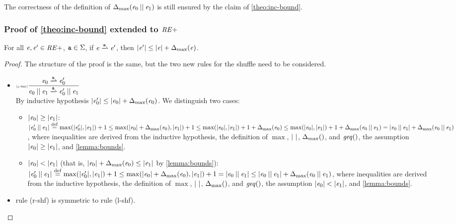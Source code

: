 The correctness of the definition of ${\Delta_{\max}}({\mathit {e}_0\mathbin{||}\mathit {e}_1})$ is still ensured by the claim of \cref{theo:inc-bound}.

\subsubsection*{Proof of \cref{theo:inc-bound} extended to $\mathit {RE+}$
}
For all $\mathit {e},\mathit {e}'\in\mathit {RE+}$, $\mathtt {a}\in\Sigma$, if $\re\parDer{\sym}\re'$, then ${\mid}{\mathit {e}'}{\mid}\leq {\mid}{\ensuremath{\mathit {e}}}{\mid}+{\Delta_{\max}}({\mathit {e}})$.

\begin{proof}
 The structure of the proof is the same, but the two new rules for the shuffle need to be considered.
 \begin{itemize}
  \item $\Rule{l-shf}{\re_0\parDer{\sym}\re'_0}{\re_0\shuffleop\re_1\parDer{\sym}\re'_0\shuffleop\re_1}{}$\\[2ex]
        By inductive hypothesis ${\mid}{\mathit {e}_0'}{\mid}\leq {\mid}{\ensuremath{\mathit {e}}_0}{\mid}+{\Delta_{\max}}({\mathit {e}_0})$.
        We distinguish two cases:
        \begin{itemize}
         \item ${\mid}{\mathit {e}_0}{\mid}\geq{\mid}{\ensuremath{\mathit {e}}_1}{\mid}$:
               ${\mid}{\mathit {e}_0'\mathbin{||}\mathit {e}_1}{\mid}\stackrel{\mathrm{def}}{=}\max({\mid}{\mathit {e}'_0}{\mid},{\mid}{\mathit {e}_1}{\mid})+1\leq\max({\mid}{\mathit {e}_0}{\mid}+{\Delta_{\max}}({\mathit {e}_0}),{\mid}{\mathit {e}_1}{\mid})+1\leq\max({\mid}{\mathit {e}_0}{\mid},{\mid}{\mathit {e}_1}{\mid})+1+{\Delta_{\max}}({\mathit {e}_0})\leq\max({\mid}{\mathit {e}_0}{\mid},{\mid}{\mathit {e}_1}{\mid})+1+{\Delta_{\max}}({\mathit {e}_0\mathbin{||}\mathit {e}_1})={\mid}{\mathit {e}_0\mathbin{||}\mathit {e}_1}{\mid}+{\Delta_{\max}}({\mathit {e}_0\mathbin{||}\mathit {e}_1})$, where inequalities are derived from the inductive hypothesis, the definition of $\max$, ${\mid}{\ }{\mid}$, ${\Delta_{\max}}({})$, and $\mathit{geq}()$, the assumption ${\mid}{\mathit {e}_0}{\mid}\geq{\mid}{\ensuremath{\mathit {e}}_1}{\mid}$, and \cref{lemma:bounds}.

         \item ${\mid}{\mathit {e}_0}{\mid}<{\mid}{\mathit {e}_1}{\mid}$ (that is, ${\mid}{\mathit {e}_0}{\mid}+{\Delta_{\max}}({\mathit {e}_0})\leq{\mid}{\ensuremath{\mathit {e}}_1}{\mid}$ by \cref{lemma:bounds}):
               ${\mid}{\mathit {e}_0'\mathbin{||}\mathit {e}_1}{\mid}\stackrel{\mathrm{def}}{=}\max({\mid}{\mathit {e}'_0}{\mid},{\mid}{\mathit {e}_1}{\mid})+1\leq\max({\mid}{\mathit {e}_0}{\mid}+{\Delta_{\max}}({\mathit {e}_0}),{\mid}{\mathit {e}_1}{\mid})+1={\mid}{\mathit {e}_0\mathbin{||}\mathit {e}_1}{\mid}\leq{\mid}{\ensuremath{\mathit {e}}_0\mathbin{||}\ensuremath{\mathit {e}}_1}{\mid}+{\Delta_{\max}}({\mathit {e}_0\mathbin{||}\mathit {e}_1})$, where inequalities are derived from the inductive hypothesis, the definition of $\max$, ${\mid}{\ }{\mid}$, ${\Delta_{\max}}({})$, and $\mathit{geq}()$, the assumption ${\mid}{\mathit {e}_0}{\mid}<{\mid}{\mathit {e}_1}{\mid}$, and \cref{lemma:bounds}.
        \end{itemize}
  \item rule (r-shf) is symmetric to rule (l-shf).
 \end{itemize}
\end{proof}

